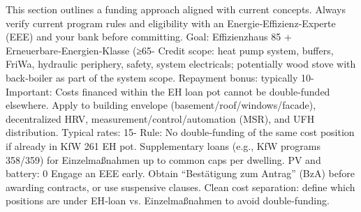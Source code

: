 \markdownRendererDocumentBegin
\markdownRendererSectionBegin
{}\markdownRendererInterblockSeparator
{}This section outlines a funding approach aligned with current concepts. Always verify current program rules and eligibility with an Energie‑Effizienz‑Experte (EEE) and your bank before committing.\markdownRendererInterblockSeparator
{}\markdownRendererSectionBegin
{}\markdownRendererInterblockSeparator
{}\markdownRendererUlBeginTight
\markdownRendererUlItem Goal: Effizienzhaus 85 + Erneuerbare‑Energien‑Klasse (≥65- Credit scope: heat pump system, buffers, FriWa, hydraulic periphery, safety, system electricals; potentially wood stove with back‑boiler as part of the system scope.\markdownRendererUlItemEnd 
\markdownRendererUlItem Repayment bonus: typically 10- Important: Costs financed within the EH loan pot cannot be double‑funded elsewhere.\markdownRendererUlItemEnd 
\markdownRendererUlEndTight \markdownRendererInterblockSeparator
{}
\markdownRendererSectionEnd \markdownRendererSectionBegin
{}\markdownRendererInterblockSeparator
{}\markdownRendererUlBeginTight
\markdownRendererUlItem Apply to building envelope (basement/roof/windows/facade), decentralized HRV, measurement/control/automation (MSR), and UFH distribution.\markdownRendererUlItemEnd 
\markdownRendererUlItem Typical rates: 15- Rule: No double‑funding of the same cost position if already in KfW 261 EH pot.\markdownRendererUlItemEnd 
\markdownRendererUlEndTight \markdownRendererInterblockSeparator
{}
\markdownRendererSectionEnd \markdownRendererSectionBegin
{}\markdownRendererInterblockSeparator
{}\markdownRendererUlBeginTight
\markdownRendererUlItem Supplementary loans (e.g., KfW programs 358/359) for Einzelmaßnahmen up to common caps per dwelling.\markdownRendererUlItemEnd 
\markdownRendererUlItem PV and battery: 0\markdownRendererUlItemEnd 
\markdownRendererUlEndTight \markdownRendererInterblockSeparator
{}
\markdownRendererSectionEnd \markdownRendererSectionBegin
{}\markdownRendererInterblockSeparator
{}\markdownRendererUlBeginTight
\markdownRendererUlItem Engage an EEE early. Obtain “Bestätigung zum Antrag” (BzA) before awarding contracts, or use suspensive clauses.\markdownRendererUlItemEnd 
\markdownRendererUlItem Clean cost separation: define which positions are under EH‑loan vs. Einzelmaßnahmen to avoid double‑funding.\markdownRendererUlItemEnd 
